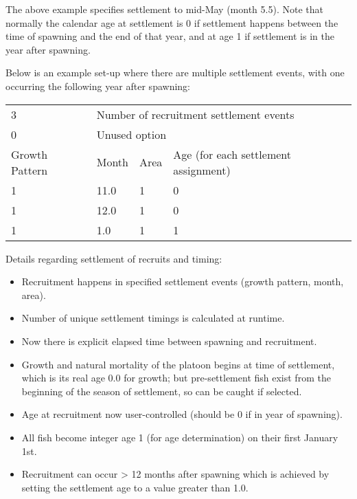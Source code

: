 The above example specifies settlement to mid-May (month 5.5). Note that normally the calendar age at settlement is 0 if settlement happens between the time of spawning and the end of that year, and at age 1 if settlement is in the year after spawning. 

Below is an example set-up where there are multiple settlement events, with one occurring the following year after spawning: 
\begin{center}
	\vspace*{-\baselineskip}
	\begin{tabular}{p{3cm} p{3cm} p{2cm} p{7cm}}
		\hline
		3 & \multicolumn{3}{l}{Number of recruitment settlement events} \Tstrut\\
		0 & \multicolumn{3}{l}{Unused option} \Bstrut\\
		\hline
		Growth Pattern & Month & Area & Age (for each settlement assignment) \Tstrut\Bstrut\\
		\hline
		1 & 11.0 & 1 & 0 \Tstrut\\
		1 & 12.0 & 1 & 0 \\
		1 & 1.0 & 1 & 1 \Bstrut\\
		\hline
	\end{tabular}		
\end{center}

Details regarding settlement of recruits and timing:
	\begin{itemize}
		\item Recruitment happens in specified settlement events (growth pattern, month, area).
		\item Number of unique settlement timings is calculated at runtime.
		\item Now there is explicit elapsed time between spawning and recruitment.
		\item Growth and natural mortality of the platoon begins at time of settlement, which is its real age 0.0 for growth; but pre-settlement fish exist from the beginning of the season of settlement, so can be caught if selected.
		\item Age at recruitment now user-controlled (should be 0 if in year of spawning).
		\item All fish become integer age 1 (for age determination) on their first January 1st.
		\item Recruitment can occur > 12 months after spawning which is achieved by setting the settlement age to a value greater than 1.0.		
	\end{itemize}

